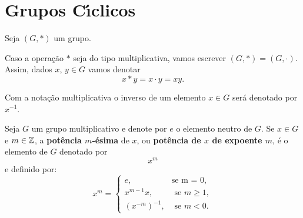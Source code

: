 \section{Grupos C{\'\i}clicos}

Seja $(G, *)$ um grupo.

Caso a opera\c{c}\~ao $*$ seja do tipo multiplicativa, vamos escrever $(G, *) = (G, \cdot)$. Assim, dados $x$, $y \in G$ vamos denotar
\[
    x * y = x \cdot y = xy.
\]

Com a nota\c{c}\~ao multiplicativa o inverso de um elemento $x \in G$ ser\'a denotado por $x^{-1}$.

\begin{definicao}
	Seja $G$ um grupo multiplicativo e denote por $e$ o elemento neutro de $G$. Se $x \in G$ e $m \in \mathbb{Z}$, a \textbf{pot\^encia $m$-\'esima} de $x$, ou \textbf{pot\^encia de $x$ de expoente $m$}, \'e o elemento de $G$ denotado por
        \[
            x^m
        \]
        e definido por:
        \[
            x^m = \begin{cases}
                    e, & \mbox{se m = 0},\\
                    x^{m-1}x, & \mbox{ se } m \ge 1,\\
                    (x^{-m})^{-1}, & \mbox{ se } m < 0. 
                   \end{cases}
        \]
\end{definicao}

